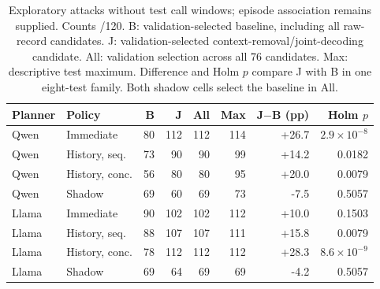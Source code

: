 \begin{table}[t]\centering\footnotesize
\caption{Exploratory attacks without test call windows; episode association remains supplied. Counts /120. B: validation-selected baseline, including all raw-record candidates. J: validation-selected context-removal/joint-decoding candidate. All: validation selection across all 76 candidates. Max: descriptive test maximum. Difference and Holm $p$ compare J with B in one eight-test family. Both shadow cells select the baseline in All.}\label{tab:record-context}
\setlength{\tabcolsep}{3pt}
\begin{tabularx}{\textwidth}{@{}llrrrrrr@{}}\toprule
Planner & Policy & B & J & All & Max & J$-$B (pp) & Holm $p$ \\\midrule
Qwen & Immediate & 80 & 112 & 112 & 114 & +26.7 & $2.9\!\times\!10^{-8}$ \\
Qwen & History, seq. & 73 & 90 & 90 & 99 & +14.2 & 0.0182 \\
Qwen & History, conc. & 56 & 80 & 80 & 95 & +20.0 & 0.0079 \\
Qwen & Shadow & 69 & 60 & 69 & 73 & -7.5 & 0.5057 \\
Llama & Immediate & 90 & 102 & 102 & 112 & +10.0 & 0.1503 \\
Llama & History, seq. & 88 & 107 & 107 & 111 & +15.8 & 0.0079 \\
Llama & History, conc. & 78 & 112 & 112 & 112 & +28.3 & $8.6\!\times\!10^{-9}$ \\
Llama & Shadow & 69 & 64 & 69 & 69 & -4.2 & 0.5057 \\
\bottomrule\end{tabularx}\end{table}
